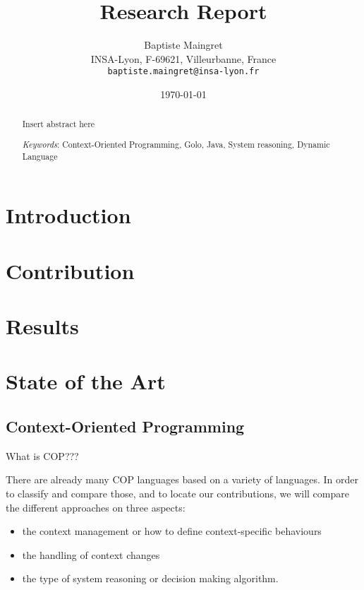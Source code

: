 \documentclass[a4paper]{article}
\begin{document}
\newpage

%
%

\title{Research Report}

\author{Baptiste Maingret\\[10pt]
INSA-Lyon, F-69621, Villeurbanne, France\\
\texttt{baptiste.maingret@insa-lyon.fr}}

\date{\today}
\newcommand{\Keywords}[1]{\par\noindent 
{\small{\em Keywords\/}: #1}}
\maketitle

\begin{abstract} 
Insert abstract here
\Keywords{Context-Oriented Programming, Golo, Java, System reasoning, Dynamic Language}
\end{abstract}

\newpage

%
%

\section{Introduction}


\section{Contribution}

\section{Results}

\section{State of the Art}

\subsection{Context-Oriented Programming}

What is COP???

There are already many COP languages based on a variety of languages. In order to classify and compare those, and to locate our contributions, we will compare the different approaches on three aspects:
\begin{itemize}
  \item the context management or how to define context-specific behaviours
  \item the handling of context changes
  \item the type of system reasoning or decision making algorithm.
\end{itemize}
\end{document}
